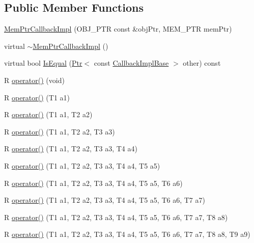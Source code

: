 \subsection*{Public Member Functions}
\begin{DoxyCompactItemize}
\item 
\hyperlink{classns3_1_1MemPtrCallbackImpl_ac13ff37887546b864915b01d6ebb1e69}{Mem\+Ptr\+Callback\+Impl} (O\+B\+J\+\_\+\+P\+TR const \&obj\+Ptr, M\+E\+M\+\_\+\+P\+TR mem\+Ptr)
\item 
virtual \hyperlink{classns3_1_1MemPtrCallbackImpl_acc83cd1b8a1f310294973b50b6964c97}{$\sim$\+Mem\+Ptr\+Callback\+Impl} ()
\item 
virtual bool \hyperlink{classns3_1_1MemPtrCallbackImpl_aea3b4a765f79ebdd810d4d26653ae0cb}{Is\+Equal} (\hyperlink{classns3_1_1Ptr}{Ptr}$<$ const \hyperlink{classns3_1_1CallbackImplBase}{Callback\+Impl\+Base} $>$ other) const 
\end{DoxyCompactItemize}
{\bf }\par
\begin{DoxyCompactItemize}
\item 
R \hyperlink{classns3_1_1MemPtrCallbackImpl_a3c93ee3889667b31e4a6ba33a22b5a9f}{operator()} (void)
\item 
R \hyperlink{classns3_1_1MemPtrCallbackImpl_a100011079fca136d11eb8cb71e7ca87c}{operator()} (T1 a1)
\item 
R \hyperlink{classns3_1_1MemPtrCallbackImpl_a18d6f56a18c608a0e4b869c3c1dc0631}{operator()} (T1 a1, T2 a2)
\item 
R \hyperlink{classns3_1_1MemPtrCallbackImpl_af65de7adf07a8bf33c94491a685a7a05}{operator()} (T1 a1, T2 a2, T3 a3)
\item 
R \hyperlink{classns3_1_1MemPtrCallbackImpl_adb36a4c66aef2ac94b1cf83c640683c5}{operator()} (T1 a1, T2 a2, T3 a3, T4 a4)
\item 
R \hyperlink{classns3_1_1MemPtrCallbackImpl_af7d0e3ec465ebc63da239c71e7d9357c}{operator()} (T1 a1, T2 a2, T3 a3, T4 a4, T5 a5)
\item 
R \hyperlink{classns3_1_1MemPtrCallbackImpl_a2d9851e62bea8caaa34e409d9ae767f1}{operator()} (T1 a1, T2 a2, T3 a3, T4 a4, T5 a5, T6 a6)
\item 
R \hyperlink{classns3_1_1MemPtrCallbackImpl_a764704351b7af9d6741ca954c4e855f2}{operator()} (T1 a1, T2 a2, T3 a3, T4 a4, T5 a5, T6 a6, T7 a7)
\item 
R \hyperlink{classns3_1_1MemPtrCallbackImpl_a99af3f7cb129dc49641b303cd08dfaa1}{operator()} (T1 a1, T2 a2, T3 a3, T4 a4, T5 a5, T6 a6, T7 a7, T8 a8)
\item 
R \hyperlink{classns3_1_1MemPtrCallbackImpl_aed96923993c142ddd8ca50af2d748d59}{operator()} (T1 a1, T2 a2, T3 a3, T4 a4, T5 a5, T6 a6, T7 a7, T8 a8, T9 a9)
\end{DoxyCompactItemize}

